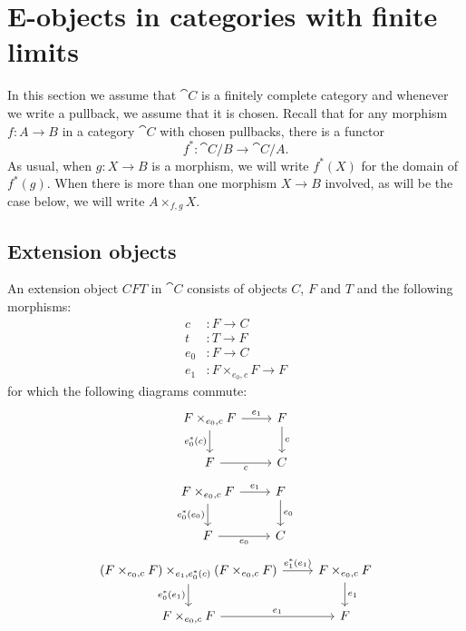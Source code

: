 \section{E-objects in categories with finite limits}
In this section we assume that $\cat{C}$ is a finitely complete category and
whenever we write a pullback, we assume that it is chosen. Recall that for
any morphism $f:A\to B$ in a category $\cat{C}$ with chosen pullbacks, there
is a functor
\begin{equation*}
f^\ast : \cat{C}/B\to\cat{C}/A.
\end{equation*}
As usual, when $g:X\to B$ is a morphism, we will write $f^\ast(X)$ for the
domain of $f^\ast(g)$. When there is more than one morphism $X\to B$ involved,
as will be the case below, we will write $A\times_{f,g}X$.

\subsection{Extension objects}
\begin{defn}
An extension object $CFT$ in $\cat{C}$ consists of objects $C$, $F$ and $T$ and the
following morphisms:
\begin{align*}
c &:F\to C\\
t &:T\to F\\
e_0 &:F\to C\\
e_1 & :F\times_{e_0,c} F\to F
\end{align*}
for which the following diagrams commute:
\begin{equation*}
\begin{tikzcd}
F\times_{e_0,c} F \ar{r}{e_1} \ar{d}[swap]{e_0^\ast(c)} & F \ar{d}{c}\\
F \ar{r}[swap]{c} & C
\end{tikzcd}
\end{equation*}
\begin{equation*}
\begin{tikzcd}
F\times_{e_0,c} F \ar{d}[swap]{e_0^\ast(e_0)} \ar{r}{e_1} & F \ar{d}{e_0}\\
F \ar{r}[swap]{e_0} & C
\end{tikzcd}
\end{equation*}
\begin{equation*}
\begin{tikzcd}
(F\times_{e_0,c} F)\times_{e_1,e_0^\ast(c)}(F\times_{e_0,c} F) 
  \ar{d}[swap]{e_0^\ast(e_1)}
  \ar{r}{e_1^\ast(e_1)}
& F\times_{e_0,c} F \ar{d}{e_1} \\
F\times_{e_0,c} F \ar{r}{e_1} & F
\end{tikzcd}
\end{equation*}
\end{defn}


